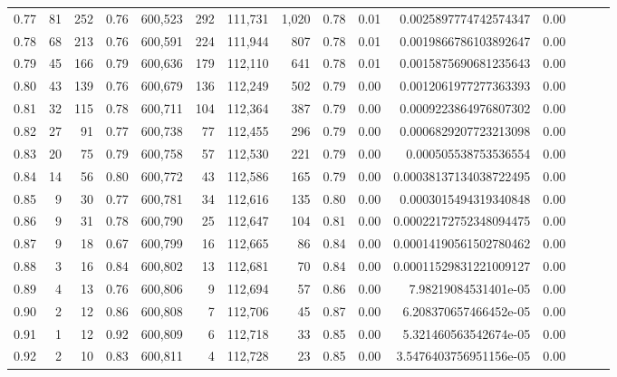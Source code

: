 \begin{tabular}{rrrrrrrrrrrrrrr}
0.77 &      81 &    252 &  0.76 &  600,523 &      292 &  111,731 &    1,020 &  0.78 &  0.01 &   0.0025897774742574347 &      0.00 \\
0.78 &      68 &    213 &  0.76 &  600,591 &      224 &  111,944 &      807 &  0.78 &  0.01 &   0.0019866786103892647 &      0.00 \\
0.79 &      45 &    166 &  0.79 &  600,636 &      179 &  112,110 &      641 &  0.78 &  0.01 &   0.0015875690681235643 &      0.00 \\
0.80 &      43 &    139 &  0.76 &  600,679 &      136 &  112,249 &      502 &  0.79 &  0.00 &   0.0012061977277363393 &      0.00 \\
0.81 &      32 &    115 &  0.78 &  600,711 &      104 &  112,364 &      387 &  0.79 &  0.00 &   0.0009223864976807302 &      0.00 \\
0.82 &      27 &     91 &  0.77 &  600,738 &       77 &  112,455 &      296 &  0.79 &  0.00 &   0.0006829207723213098 &      0.00 \\
0.83 &      20 &     75 &  0.79 &  600,758 &       57 &  112,530 &      221 &  0.79 &  0.00 &    0.000505538753536554 &      0.00 \\
0.84 &      14 &     56 &  0.80 &  600,772 &       43 &  112,586 &      165 &  0.79 &  0.00 &  0.00038137134038722495 &      0.00 \\
0.85 &       9 &     30 &  0.77 &  600,781 &       34 &  112,616 &      135 &  0.80 &  0.00 &   0.0003015494319340848 &      0.00 \\
0.86 &       9 &     31 &  0.78 &  600,790 &       25 &  112,647 &      104 &  0.81 &  0.00 &  0.00022172752348094475 &      0.00 \\
0.87 &       9 &     18 &  0.67 &  600,799 &       16 &  112,665 &       86 &  0.84 &  0.00 &  0.00014190561502780462 &      0.00 \\
0.88 &       3 &     16 &  0.84 &  600,802 &       13 &  112,681 &       70 &  0.84 &  0.00 &  0.00011529831221009127 &      0.00 \\
0.89 &       4 &     13 &  0.76 &  600,806 &        9 &  112,694 &       57 &  0.86 &  0.00 &    7.98219084531401e-05 &      0.00 \\
0.90 &       2 &     12 &  0.86 &  600,808 &        7 &  112,706 &       45 &  0.87 &  0.00 &   6.208370657466452e-05 &      0.00 \\
0.91 &       1 &     12 &  0.92 &  600,809 &        6 &  112,718 &       33 &  0.85 &  0.00 &   5.321460563542674e-05 &      0.00 \\
0.92 &       2 &     10 &  0.83 &  600,811 &        4 &  112,728 &       23 &  0.85 &  0.00 &  3.5476403756951156e-05 &      0.00 \\

\end{tabular}
